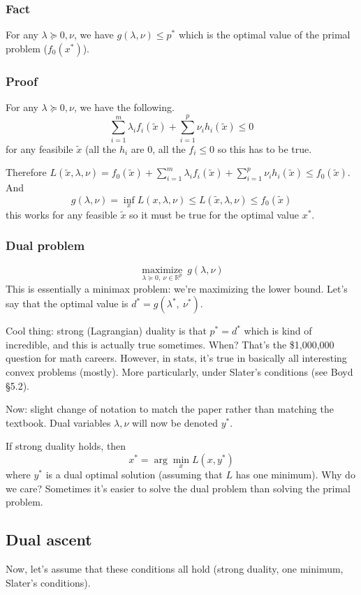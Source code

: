 \documentclass{article}
\begin{document}
\subsubsection{Fact}
For any $\lambda \succeq 0, \nu$, we have
$g(\lambda, \nu)\leq p^*$ which is the optimal value of the primal problem ($f_0(x^*)$). 

\subsubsection{Proof}

For any $\lambda \succeq 0, \nu$, we have the following.
$$\sum_{i=1}^m \lambda_i f_i(\tilde{x}) + \sum_{i=1}^p\nu_i h_i(\tilde{x}) \leq 0$$
for any feasibile $\tilde{x}$ (all the $h_i$ are 0, all the $f_i \leq 0$ so this has to be true.

Therefore $L(\tilde{x}, \lambda, \nu)=f_0(\tilde{x}) + \sum_{i=1}^m \lambda_i f_i(\tilde{x}) + \sum_{i=1}^p\nu_i h_i(\tilde{x})\leq f_0(\tilde{x})$. And
$$g(\lambda, \nu)=\inf_x L(x, \lambda, \nu)\leq L(\tilde{x}, \lambda, \nu)\leq f_0(\tilde{x})$$
this works for any feasible $\tilde{x}$ so it must be true for the optimal value $x^*$.

\subsubsection{Dual problem}
$$\underset{\lambda\succeq 0,~ \nu\in\mathbb{R}^p}{\operatorname{maximize}}~ g(\lambda, \nu)$$
This is essentially a minimax problem: we're maximizing the lower bound. Let's say that the optimal value is $d^*=g(\lambda^*,~\nu^*)$.

Cool thing: strong (Lagrangian) duality is that $p^*=d^*$ which is kind of incredible, and this
is actually true sometimes. When? That's the \$1,000,000 question for math careers. However, in stats, it's true in basically all interesting convex problems (mostly). More particularly, under Slater's conditions (see Boyd \S5.2).

Now: slight change of notation to match the paper rather than matching the textbook. Dual variables $\lambda, \nu$ will now be denoted $y^*$.

If strong duality holds, then
$$x^*=\arg\min_x L(x, y^*)$$ where $y^*$ is a dual optimal solution (assuming that $L$ has one minimum). Why do we care? Sometimes it's easier to solve the dual problem than solving the primal problem.

\subsection{Dual ascent}
Now, let's assume that these conditions all hold (strong duality, one minimum, Slater's conditions).
\end{document}
